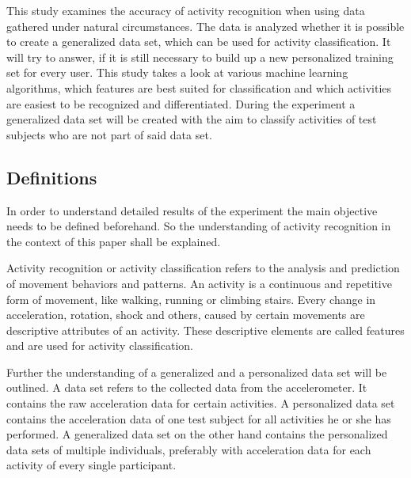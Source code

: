 This study examines the accuracy of activity recognition when using data gathered under natural circumstances. The data is analyzed whether it is possible to create a generalized data set, which can be used for activity classification. It will try to answer, if it is still necessary to build up a new personalized training set for every user. This study takes a look at various machine learning algorithms, which features are best suited for classification and which activities are easiest to be recognized and differentiated. During the experiment a generalized data set will be created with the aim to classify activities of test subjects who are not part of said data set.


\subsection{Definitions}
In order to understand detailed results of the experiment the main objective needs to be defined beforehand. So the understanding of activity recognition in the context of this paper shall be explained.

Activity recognition or activity classification refers to the analysis and prediction of movement behaviors and patterns. An activity is a continuous and repetitive form of movement, like walking, running or climbing stairs. Every change in acceleration, rotation, shock and others, caused by certain movements are descriptive attributes of an activity. These descriptive elements are called features and are used for activity classification.

Further the understanding of a generalized and a personalized data set will be outlined. A data set refers to the collected data from the accelerometer. It contains the raw acceleration data for certain activities. A personalized data set contains the acceleration data of one test subject for all activities he or she has performed. A generalized data set on the other hand contains the personalized data sets of multiple individuals, preferably with acceleration data for each activity of every single participant.
